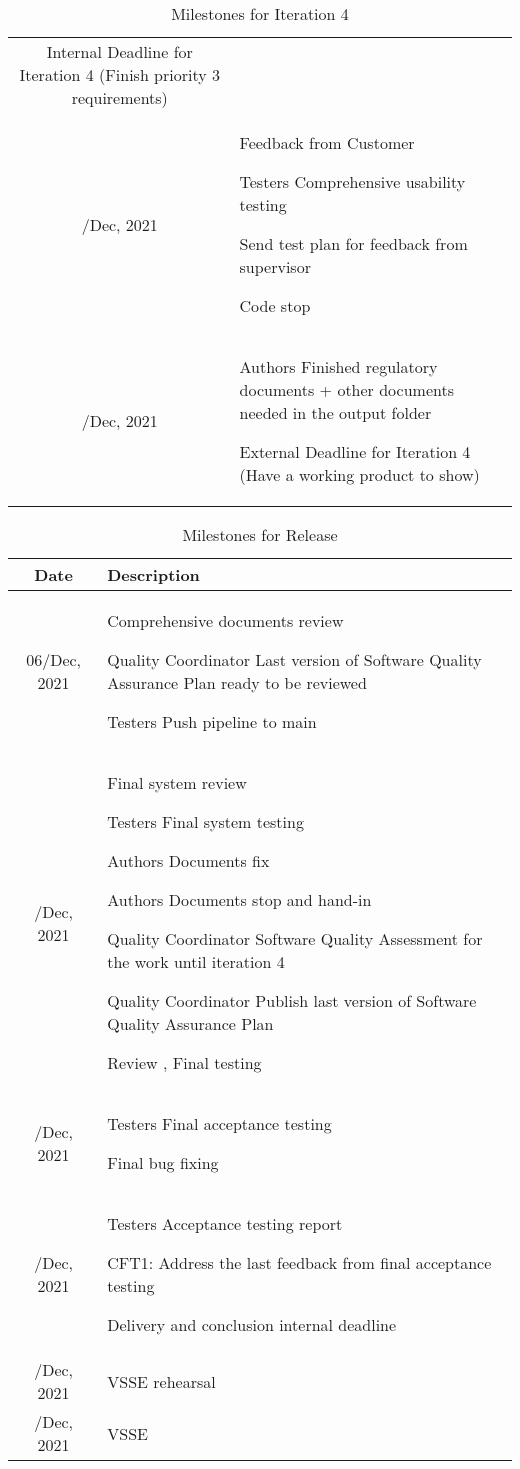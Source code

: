 \begin{table}[H]
\begin{tabular}{cp{9cm}}
    Internal Deadline for Iteration 4 (Finish priority 3 requirements) \\
    \addlinespace
    03/Dec, 2021
    & Feedback from Customer
    
    Testers Comprehensive usability testing
    
    Send test plan for feedback from supervisor
    
    Code stop \\
    \addlinespace
    05/Dec, 2021
    & Authors Finished regulatory documents +  other documents needed in the output folder

    External Deadline for Iteration 4 (Have a working product to show) \\
    \bottomrule
\end{tabular}
\caption{Milestones for Iteration 4}
\label{tab: Milestones iteration 4}
\end{table}

\begin{table}[H]
\centering
\begin{tabular}{cp{9cm}}
    \toprule
    Date & Description \\
    \midrule
    06/Dec, 2021    
    & Comprehensive documents review
    
    Quality Coordinator Last version of Software Quality Assurance Plan ready to be reviewed
    
    Testers Push pipeline to main \\
    \addlinespace
    07/Dec, 2021
    & Final system review

    Testers Final system testing
    
    Authors Documents fix
    
    Authors Documents stop and hand-in
    
    Quality Coordinator Software Quality Assessment for the work until iteration 4
    
    Quality Coordinator Publish last version of Software Quality Assurance Plan
    
    Review , Final testing  \\
    \addlinespace
    08/Dec, 2021
    & Testers Final acceptance testing

    Final bug fixing \\
    \addlinespace
    09/Dec, 2021
    & Testers Acceptance testing report
    
    CFT1: Address the last feedback from final acceptance testing
    
    Delivery and conclusion internal deadline \\

    \addlinespace
    14/Dec, 2021
    & VSSE rehearsal \\
    \addlinespace
    16 /Dec, 2021
    & VSSE \\
    \bottomrule
\end{tabular}
\caption{Milestones for Release}
\label{tab: Milestones Release}
\end{table}

